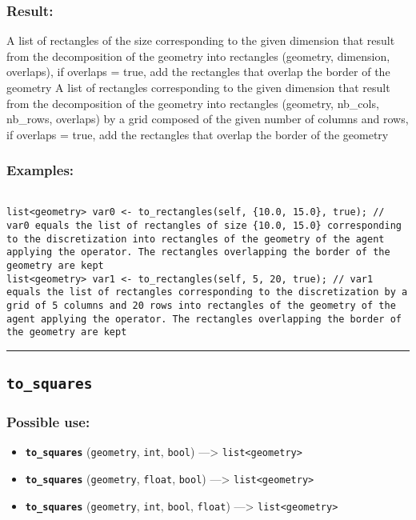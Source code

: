 \documentclass[]{book}
\providecommand{\tightlist}{%
  \setlength{\itemsep}{0pt}\setlength{\parskip}{0pt}}
\theoremstyle{definition}
\theoremstyle{definition}
\theoremstyle{definition}
\theoremstyle{remark}
\begin{document}
\subsubsection{Result:}\label{result-504}

A list of rectangles of the size corresponding to the given dimension
that result from the decomposition of the geometry into rectangles
(geometry, dimension, overlaps), if overlaps = true, add the rectangles
that overlap the border of the geometry A list of rectangles
corresponding to the given dimension that result from the decomposition
of the geometry into rectangles (geometry, nb\_cols, nb\_rows, overlaps)
by a grid composed of the given number of columns and rows, if overlaps
= true, add the rectangles that overlap the border of the geometry

\subsubsection{Examples:}\label{examples-360}

\begin{verbatim}
 
list<geometry> var0 <- to_rectangles(self, {10.0, 15.0}, true); // var0 equals the list of rectangles of size {10.0, 15.0} corresponding to the discretization into rectangles of the geometry of the agent applying the operator. The rectangles overlapping the border of the geometry are kept 
list<geometry> var1 <- to_rectangles(self, 5, 20, true); // var1 equals the list of rectangles corresponding to the discretization by a grid of 5 columns and 20 rows into rectangles of the geometry of the agent applying the operator. The rectangles overlapping the border of the geometry are kept
\end{verbatim}

\begin{center}\rule{0.5\linewidth}{\linethickness}\end{center}

\subsection{\texorpdfstring{\texttt{to\_squares}}{to\_squares}}\label{to_squares}

\subsubsection{Possible use:}\label{possible-use-523}

\begin{itemize}
\tightlist
\item
  \textbf{\texttt{to\_squares}} (\texttt{geometry}, \texttt{int},
  \texttt{bool}) ---\textgreater{}
  \texttt{list\textless{}geometry\textgreater{}}
\item
  \textbf{\texttt{to\_squares}} (\texttt{geometry}, \texttt{float},
  \texttt{bool}) ---\textgreater{}
  \texttt{list\textless{}geometry\textgreater{}}
\item
  \textbf{\texttt{to\_squares}} (\texttt{geometry}, \texttt{int},
  \texttt{bool}, \texttt{float}) ---\textgreater{}
  \texttt{list\textless{}geometry\textgreater{}}
\end{itemize}
\end{document}
